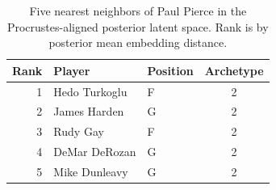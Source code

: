 \begin{table}[htbp]
  \centering\small
  \begin{tabular}{rllc}
    \toprule
    Rank & Player & Position & Archetype \\
    \midrule
    1 & Hedo Turkoglu & F & 2 \\
    2 & James Harden & G & 2 \\
    3 & Rudy Gay & F & 2 \\
    4 & DeMar DeRozan & G & 2 \\
    5 & Mike Dunleavy & G & 2 \\
    \bottomrule
  \end{tabular}
  \caption{Five nearest neighbors of Paul Pierce in the Procrustes-aligned posterior latent space. Rank is by posterior mean embedding distance.}
  \label{tab:Paul_Pierce_neighbors}
\end{table}

